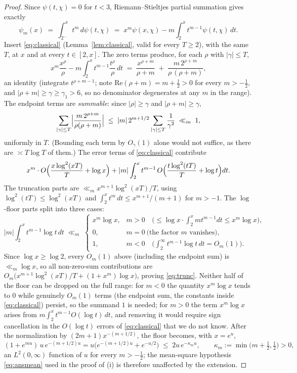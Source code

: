 \begin{proof}
Since $\psi(t,\chi)=0$ for $t<3$, Riemann--Stieltjes partial summation
gives exactly
\[
\psi_m(x)\;=\;\int_{2^-}^{x}t^m\,d\psi(t,\chi)
\;=\;x^m\psi(x,\chi)-m\int_2^x t^{m-1}\psi(t,\chi)\,dt .
\]
Insert \eqref{eq:classical} (Lemma~\ref{lem:classical}, valid for every
$T\ge2$), with the same $T$, at $x$ and at every $t\in[2,x]$. The zero
terms produce, for each $\rho$ with $|\gamma|\le T$,
\[
x^m\frac{x^{\rho}}{\rho}-m\int_2^x t^{m-1}\frac{t^{\rho}}{\rho}\,dt
\;=\;\frac{x^{\rho+m}}{\rho+m}
\;+\;\frac{m\,2^{\rho+m}}{\rho\,(\rho+m)},
\]
an identity (integrate $t^{\rho+m-1}$; note
$\mathrm{Re}(\rho+m)=m+\tfrac12>0$ for every $m>-\tfrac12$, and
$|\rho+m|\ge\gamma\ge\gamma_1>6$, so no denominator degenerates at any
$m$ in the range). The endpoint terms are \emph{summable}: since
$|\rho|\ge\gamma$ and $|\rho+m|\ge\gamma$,
\[
\sum_{|\gamma|\le T}\Bigl|\frac{m\,2^{\rho+m}}{\rho(\rho+m)}\Bigr|
\;\le\;|m|\,2^{m+1/2}\sum_{|\gamma|\le T}\frac{1}{\gamma^{2}}
\;\ll_m\;1,
\]
uniformly in $T$. (Bounding each term by $O_\gamma(1)$ alone would not
suffice, as there are $\asymp T\log T$ of them.) The error terms of
\eqref{eq:classical} contribute
\[
x^m\cdot O\Bigl(\frac{x\log^2(xT)}{T}+\log x\Bigr)
+|m|\int_2^x t^{m-1}\,O\Bigl(\frac{t\log^2(tT)}{T}+\log t\Bigr)dt .
\]
The truncation parts are
$\ll_m x^{m+1}\log^2(xT)/T$, using $\log^2(tT)\le\log^2(xT)$ and
$\int_2^xt^m\,dt\le x^{m+1}/(m+1)$ for $m>-1$. The $\log$-floor parts
split into three cases:
\[
|m|\int_2^x t^{m-1}\log t\,dt\;\ll_m\;
\begin{cases}
x^m\log x, & m>0
\quad\bigl(\le\log x\cdot\int_2^x mt^{m-1}dt\le x^m\log x\bigr),\\
0, & m=0 \ \text{(the factor $m$ vanishes)},\\
1, & m<0
\quad\bigl(\int_2^\infty t^{m-1}\log t\,dt=O_m(1)\bigr).
\end{cases}
\]
Since $\log x\ge\log2$, every $O_m(1)$ above (including the endpoint
sum) is $\ll_m\log x$, so all non-zero-sum contributions are
$O_m\bigl(x^{m+1}\log^2(xT)/T+(1+x^m)\log x\bigr)$, proving
\eqref{eq:trunc}. Neither half of the floor can be dropped on the full
range: for $m<0$ the quantity $x^m\log x$ tends to $0$ while genuinely
$O_m(1)$ terms (the endpoint sum, the constants inside
\eqref{eq:classical}) persist, so the summand $1$ is needed; for $m>0$
the term $x^m\log x$ arises from $m\int_2^xt^{m-1}O(\log t)\,dt$, and
removing it would require sign cancellation in the $O(\log t)$ errors
of \eqref{eq:classical} that we do not know. After the normalization by
$(2m+1)x^{-(m+1/2)}$, the floor becomes, with $x=e^u$,
\[
(1+e^{mu})\,u\,e^{-(m+1/2)u}
=u\bigl(e^{-(m+1/2)u}+e^{-u/2}\bigr)
\;\le\;2u\,e^{-\kappa_m u},
\qquad
\kappa_m:=\min\bigl(m+\tfrac12,\tfrac12\bigr)>0,
\]
an $L^2(0,\infty)$ function of $u$ for every $m>-\tfrac12$; the
mean-square hypothesis \eqref{eq:ansmean} used in the proof of (i) is
therefore unaffected by the extension.
\end{proof}


